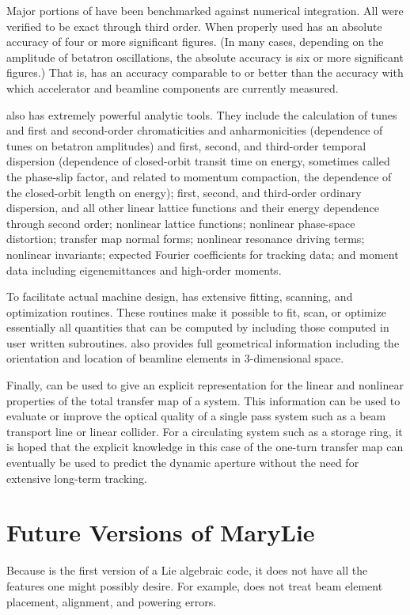 Major portions of  have been benchmarked against numerical integration.
All were verified to be exact through third order.  When properly used \Mary has
an absolute accuracy of four or more significant figures.  (In many cases,
depending on the amplitude of  betatron oscillations, the absolute accuracy is six
or more significant figures.)  That is, \Mary has an accuracy comparable to or
better than the accuracy with which accelerator and beamline components are
currently measured.

\Mary also has extremely powerful analytic tools.  They include the calculation of
tunes and first and second-order chromaticities and anharmonicities  (dependence of tunes on betatron
amplitudes) and first, second, and third-order temporal dispersion
(dependence of closed-orbit transit time on energy, sometimes called the
phase-slip factor, and related to momentum compaction, the dependence of
the closed-orbit  length on energy);  first, second, and third-order
ordinary dispersion, and all other linear lattice functions and their energy dependence
through second order; nonlinear lattice functions; nonlinear phase-space distortion; transfer map normal forms;
nonlinear resonance driving terms; nonlinear invariants; expected Fourier
coefficients for tracking data; and moment data including eigenemittances
and high-order moments.

To facilitate actual machine design, \Mary has extensive fitting,  scanning, and
optimization routines.  These routines make it possible to  fit, scan, or optimize
essentially all quantities that can be computed by \Mary including those computed
in user written subroutines.  \Mary also provides full geometrical
information including the orientation and location of beamline elements
in 3-dimensional space.

Finally, \Mary can be used to give an explicit representation for the linear and
nonlinear properties of the total transfer map of a system.  This information can
be used to evaluate or improve the optical quality of a single pass system such as
a beam transport line or linear collider.  For a circulating system such as a
storage ring, it is hoped that the explicit knowledge in this case of the one-turn
transfer map can eventually be used to predict the dynamic aperture without the
need for extensive long-term tracking.

\section{Future Versions of MaryLie}
Because  is the first version of a Lie algebraic code, it does not have
all the features one might possibly desire.  For example,  does not treat
beam element placement, alignment, and powering errors.

